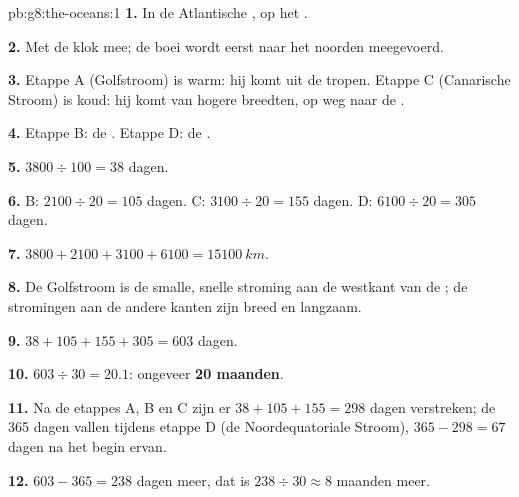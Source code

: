 \begin{solution}{pb:g8:the-oceans:1}
\textbf{1.} In de Atlantische , op het .

\textbf{2.} Met de klok mee; de boei wordt eerst naar het noorden meegevoerd.

\textbf{3.} Etappe A (Golfstroom) is warm: hij komt uit de tropen. Etappe
C (Canarische Stroom) is koud: hij komt van hogere breedten, op weg naar de
.

\textbf{4.} Etappe B: de . Etappe D: de .

\textbf{5.} $3800 \div 100 = 38$ dagen.

\textbf{6.} B: $2100 \div 20 = 105$ dagen. C: $3100 \div 20 = 155$ dagen.
D: $6100 \div 20 = 305$ dagen.

\textbf{7.} $3800 + 2100 + 3100 + 6100 = \qty{15100}{km}$.

\textbf{8.} De Golfstroom is de smalle, snelle stroming aan de westkant van
de ; de stromingen aan de andere kanten zijn breed en langzaam.

\textbf{9.} $38 + 105 + 155 + 305 = 603$ dagen.

\textbf{10.} $603 \div 30 = 20.1$: ongeveer \textbf{20 maanden}.

\textbf{11.} Na de etappes A, B en C zijn er $38 + 105 + 155 = 298$ dagen
verstreken; de 365 dagen vallen tijdens etappe D (de Noordequatoriale
Stroom), $365 -
298 = 67$ dagen na het begin ervan.

\textbf{12.} $603 - 365 = 238$ dagen meer, dat is $238 \div 30 \approx 8$
maanden meer.
\end{solution}
